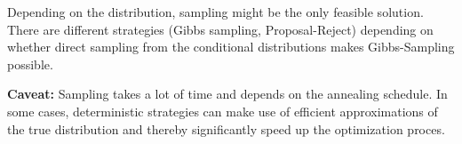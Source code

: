 Depending on the distribution, sampling might be the only feasible
solution.  There are different strategies (Gibbs sampling,
Proposal-Reject) depending on whether direct sampling from the
conditional distributions makes Gibbs-Sampling possible.


\textbf{Caveat:} Sampling takes a lot of time and depends on the
annealing schedule. In some cases, deterministic strategies can make
use of efficient approximations of the true distribution and thereby
significantly speed up the optimization proces.



